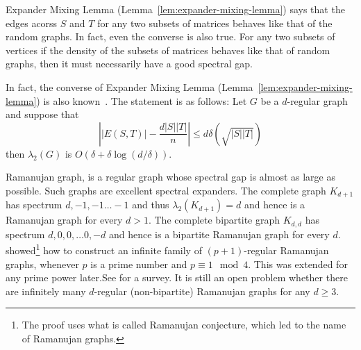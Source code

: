 \begin{curiousity}
Expander Mixing Lemma (Lemma~\ref{lem:expander-mixing-lemma}) says that the edges acorss $S$ and $T$ for any two subsets of matrices behaves like that of the random graphs. In fact, even the converse is also true. For any two subsets of vertices if the density of the subsets of matrices behaves like that of random graphs, then it must necessarily have a good spectral gap.

In fact, the converse of Expander Mixing Lemma (Lemma~\ref{lem:expander-mixing-lemma}) is also known~\cite{BL06}. The statement is as follows:
Let $G$ be a $d$-regular graph and suppose that
$$\left||E(S,T)|-\frac{d|S||T|}{n}\right| \le d\delta \left(\sqrt{|S||T|}\right)$$
then $\lambda_2(G)$ is $O\left(\delta+\delta\log\left(d/\delta\right)\right)$.
\end{curiousity}

%
\begin{curiousity}
Ramanujan graph, is a regular graph whose spectral gap is almost as large as possible. Such graphs are excellent spectral expanders. The complete graph $K_{d+1}$  has spectrum $d,-1, -1 \ldots -1$ and thus $\lambda_2(K_{d+1}) = d$ and hence is a Ramanujan graph for every $d > 1$. The complete bipartite graph $K_{d,d}$ has spectrum $d,0,0, \ldots 0, -d$ and hence is a bipartite Ramanujan graph for every $d$. \cite{LRS88} showed\footnote{The proof uses what is called Ramanujan conjecture, which led to the name of Ramanujan graphs.} how to construct an infinite family of $(p+1)$-regular Ramanujan graphs, whenever $p$ is a prime number and $p \equiv 1 \mod 4$. This was extended for any prime power later.See \cite{Mur03} for a survey. 
It is still an open problem whether there are infinitely many $d$-regular (non-bipartite) Ramanujan graphs for any $d \geq 3$.
\end{curiousity}

